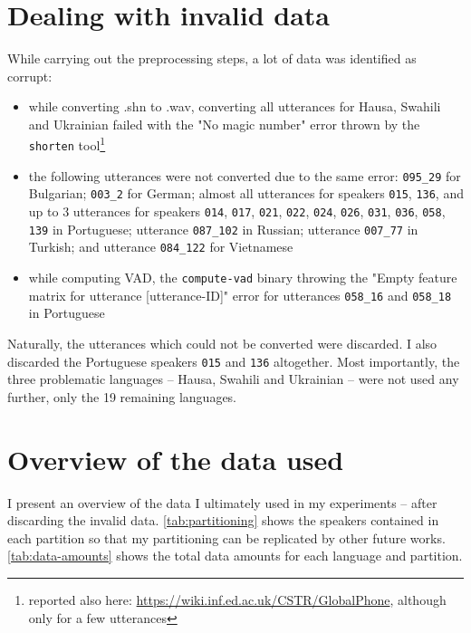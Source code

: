 \documentclass[bsc,frontabs,twoside,singlespacing,parskip,deptreport]{infthesis}
\begin{document}
{  \section{Dealing with invalid data}{
    \label{sec:invalid-data}
    While carrying out the preprocessing steps, a lot of data was identified as corrupt:
    \begin{itemize}
      \item {while converting .shn to .wav, converting all utterances for Hausa, Swahili and Ukrainian failed with the "No magic number" error thrown by the \texttt{shorten} tool\footnote{reported also here: \url{https://wiki.inf.ed.ac.uk/CSTR/GlobalPhone}, although only for a few utterances}}
      \item {the following utterances were not converted due to the same error: \texttt{095\_29} for Bulgarian; \texttt{003\_2} for German; almost all utterances for speakers \texttt{015}, \texttt{136}, and up to 3 utterances for speakers \texttt{014}, \texttt{017}, \texttt{021}, \texttt{022}, \texttt{024}, \texttt{026}, \texttt{031}, \texttt{036}, \texttt{058}, \texttt{139} in Portuguese; utterance \texttt{087\_102} in Russian; utterance \texttt{007\_77} in Turkish; and utterance \texttt{084\_122} for Vietnamese}
      \item {while computing VAD, the \texttt{compute-vad} binary throwing the "Empty feature matrix for utterance [utterance-ID]" error for utterances \texttt{058\_16} and \texttt{058\_18} in Portuguese}
    \end{itemize}

    Naturally, the utterances which could not be converted were discarded. I also discarded the Portuguese speakers \texttt{015} and \texttt{136} altogether. Most importantly, the three problematic languages -- Hausa, Swahili and Ukrainian -- were not used any further, only the 19 remaining languages.
  }

  \section{Overview of the data used}{
    \label{sec:data-overview}
    I present an overview of the data I ultimately used in my experiments -- after discarding the invalid data. \autoref{tab:partitioning} shows the speakers contained in each partition so that my partitioning can be replicated by other future works. \autoref{tab:data-amounts} shows the total data amounts for each language and partition.

}}
\end{document}

